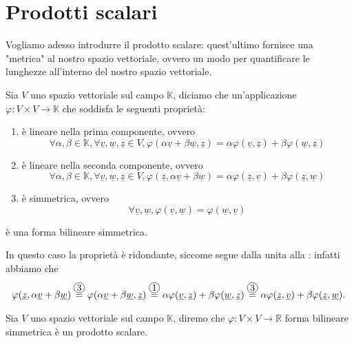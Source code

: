 \chapter{Prodotti scalari}

Vogliamo adesso introdurre il prodotto scalare: quest'ultimo fornisce una "metrica" al nostro spazio vettoriale, ovvero un modo per quantificare le lunghezze all'interno del nostro spazio vettoriale.

\begin{definition}
	Sia $V$ uno spazio vettoriale sul campo $\mathbb{K}$, diciamo che un'applicazione $\varphi : V \times V \to \mathbb{K}$ che soddisfa le seguenti proprietà:
	\begin{enumerate}[label=\protect\circled{\arabic*}]
		\item è lineare nella prima componente, ovvero
		$$\forall \alpha, \beta \in \mathbb{K}, \forall \underline{v}, \underline{w}, \underline{z} \in V, \varphi(\alpha \underline{v} + \beta \underline{w}, \underline{z})=\alpha \varphi(\underline{v}, \underline{z}) + \beta \varphi(\underline{w}, \underline{z})$$
		\item è lineare nella seconda componente, ovvero
		$$\forall \alpha, \beta \in \mathbb{K}, \forall \underline{v}, \underline{w}, \underline{z} \in V, \varphi(\underline{z}, \alpha \underline{v} + \beta \underline{w}) = \alpha \varphi(\underline{z}, \underline{v}) + \beta \varphi(\underline{z}, \underline{w})$$
		\item è simmetrica, ovvero
		$$\forall \underline{v}, \underline{w}, \varphi(\underline{v}, \underline{w}) = \varphi(\underline{w}, \underline{v})$$
	\end{enumerate}
	è una forma bilineare simmetrica.
\end{definition}
\begin{remark}
	In questo caso la proprietà  è ridondante, siccome segue dalla  unita alla : infatti abbiamo che
	\begin{align}
		\varphi(\underline{z}, \alpha \underline{v} + \beta \underline{w}) \stackrel{\circled{3}}{=} \varphi(\alpha \underline{v} + \beta \underline{w}, \underline{z}) \stackrel{\circled{1}}{=} \alpha \varphi(\underline{v}, \underline{z}) + \beta \varphi(\underline{w}, \underline{z}) \stackrel{\circled{3}}{=} \alpha \varphi(\underline{z}, \underline{v}) + \beta \varphi(\underline{z}, \underline{w}).
	\end{align}
\end{remark}
\begin{definition}
	Sia $V$ uno spazio vettoriale sul campo $\mathbb{K}$, diremo che $\varphi: V \times V \to \mathbb{R}$ forma bilineare simmetrica è un prodotto scalare.
\end{definition}

